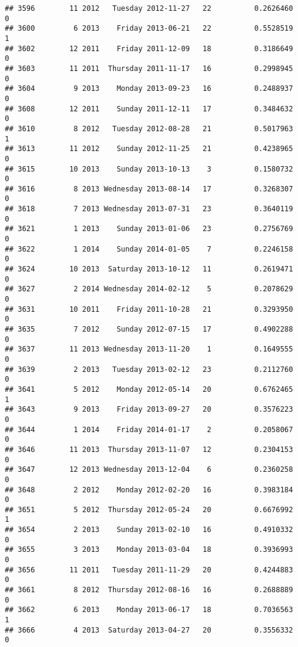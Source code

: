 \documentclass[
]{article}
\begin{document}
\begin{verbatim}
## 3596        11 2012   Tuesday 2012-11-27   22          0.2626460             0
## 3600         6 2013    Friday 2013-06-21   22          0.5528519             1
## 3602        12 2011    Friday 2011-12-09   18          0.3186649             0
## 3603        11 2011  Thursday 2011-11-17   16          0.2998945             0
## 3604         9 2013    Monday 2013-09-23   16          0.2488937             0
## 3608        12 2011    Sunday 2011-12-11   17          0.3484632             0
## 3610         8 2012   Tuesday 2012-08-28   21          0.5017963             1
## 3613        11 2012    Sunday 2012-11-25   21          0.4238965             0
## 3615        10 2013    Sunday 2013-10-13    3          0.1580732             0
## 3616         8 2013 Wednesday 2013-08-14   17          0.3268307             0
## 3618         7 2013 Wednesday 2013-07-31   23          0.3640119             0
## 3621         1 2013    Sunday 2013-01-06   23          0.2756769             0
## 3622         1 2014    Sunday 2014-01-05    7          0.2246158             0
## 3624        10 2013  Saturday 2013-10-12   11          0.2619471             0
## 3627         2 2014 Wednesday 2014-02-12    5          0.2078629             0
## 3631        10 2011    Friday 2011-10-28   21          0.3293950             0
## 3635         7 2012    Sunday 2012-07-15   17          0.4902288             0
## 3637        11 2013 Wednesday 2013-11-20    1          0.1649555             0
## 3639         2 2013   Tuesday 2013-02-12   23          0.2112760             0
## 3641         5 2012    Monday 2012-05-14   20          0.6762465             1
## 3643         9 2013    Friday 2013-09-27   20          0.3576223             0
## 3644         1 2014    Friday 2014-01-17    2          0.2058067             0
## 3646        11 2013  Thursday 2013-11-07   12          0.2304153             0
## 3647        12 2013 Wednesday 2013-12-04    6          0.2360258             0
## 3648         2 2012    Monday 2012-02-20   16          0.3983184             0
## 3651         5 2012  Thursday 2012-05-24   20          0.6676992             1
## 3654         2 2013    Sunday 2013-02-10   16          0.4910332             0
## 3655         3 2013    Monday 2013-03-04   18          0.3936993             0
## 3656        11 2011   Tuesday 2011-11-29   20          0.4244883             0
## 3661         8 2012  Thursday 2012-08-16   16          0.2688889             0
## 3662         6 2013    Monday 2013-06-17   18          0.7036563             1
## 3666         4 2013  Saturday 2013-04-27   20          0.3556332             0

\end{verbatim}
\end{document}
